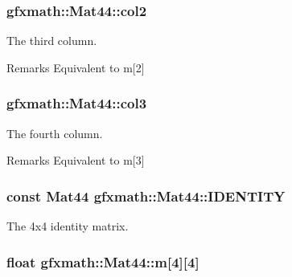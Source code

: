 \subsubsection[{col2}]{ gfxmath\+::\+Mat44\+::col2}\label{structgfxmath_1_1_mat44_aa810627c4b5df8432b36befdd4649763}


The third column. 

\begin{DoxyRemark}{Remarks}
Equivalent to m\mbox{[}2\mbox{]} 
\end{DoxyRemark}
\hypertarget{structgfxmath_1_1_mat44_a09c1b1363d41cee3b241cf8843d02289}{}
\subsubsection[{col3}]{ gfxmath\+::\+Mat44\+::col3}\label{structgfxmath_1_1_mat44_a09c1b1363d41cee3b241cf8843d02289}


The fourth column. 

\begin{DoxyRemark}{Remarks}
Equivalent to m\mbox{[}3\mbox{]} 
\end{DoxyRemark}
\hypertarget{structgfxmath_1_1_mat44_acf3201b485f8e67fd931703fb2c55ead}{}
\subsubsection[{I\+D\+E\+N\+T\+I\+T\+Y}]{\setlength{\rightskip}{0pt plus 5cm}const {\bf Mat44} gfxmath\+::\+Mat44\+::\+I\+D\+E\+N\+T\+I\+T\+Y\hspace{0.3cm}{\ttfamily [static]}}\label{structgfxmath_1_1_mat44_acf3201b485f8e67fd931703fb2c55ead}


The 4x4 identity matrix. 

\hypertarget{structgfxmath_1_1_mat44_a59a6195e1c74aee94b3434b9fed8aa7a}{}
\subsubsection[{m}]{\setlength{\rightskip}{0pt plus 5cm}float gfxmath\+::\+Mat44\+::m\mbox{[}4\mbox{]}\mbox{[}4\mbox{]}}\label{structgfxmath_1_1_mat44_a59a6195e1c74aee94b3434b9fed8aa7a}


